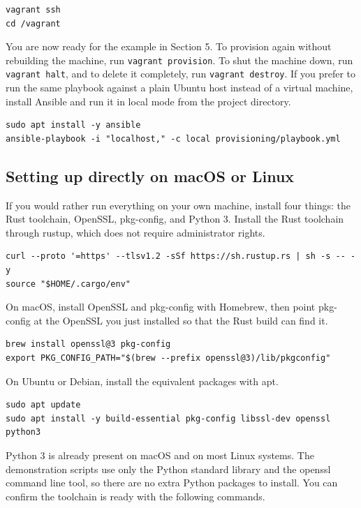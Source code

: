 \documentclass[11pt,a4paper]{article}
\begin{document}
\begin{lstlisting}
vagrant ssh
cd /vagrant
\end{lstlisting}

You are now ready for the example in Section 5. To provision again without
rebuilding the machine, run \texttt{vagrant provision}. To shut the machine down,
run \texttt{vagrant halt}, and to delete it completely, run
\texttt{vagrant destroy}. If you prefer to run the same playbook against a plain
Ubuntu host instead of a virtual machine, install Ansible and run it in local
mode from the project directory.

\begin{lstlisting}
sudo apt install -y ansible
ansible-playbook -i "localhost," -c local provisioning/playbook.yml
\end{lstlisting}

\subsection{Setting up directly on macOS or Linux}

If you would rather run everything on your own machine, install four things: the
Rust toolchain, OpenSSL, pkg-config, and Python 3. Install the Rust toolchain
through rustup, which does not require administrator rights.

\begin{lstlisting}
curl --proto '=https' --tlsv1.2 -sSf https://sh.rustup.rs | sh -s -- -y
source "$HOME/.cargo/env"
\end{lstlisting}

On macOS, install OpenSSL and pkg-config with Homebrew, then point pkg-config at
the OpenSSL you just installed so that the Rust build can find it.

\begin{lstlisting}
brew install openssl@3 pkg-config
export PKG_CONFIG_PATH="$(brew --prefix openssl@3)/lib/pkgconfig"
\end{lstlisting}

On Ubuntu or Debian, install the equivalent packages with apt.

\begin{lstlisting}
sudo apt update
sudo apt install -y build-essential pkg-config libssl-dev openssl python3
\end{lstlisting}

Python 3 is already present on macOS and on most Linux systems. The demonstration
scripts use only the Python standard library and the openssl command line tool,
so there are no extra Python packages to install. You can confirm the toolchain
is ready with the following commands.
\end{document}
